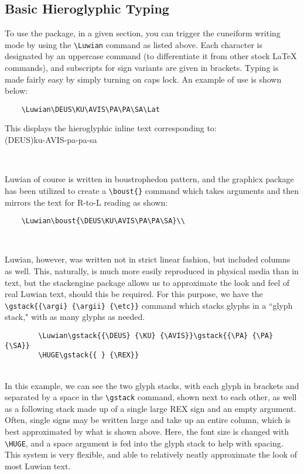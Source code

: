 \documentclass[12pt,A4]{article}
\begin{document}
\subsection{Basic Hieroglyphic Typing}
To use the package, in a given section, you can trigger the cuneiform writing mode by using the \verb|\Luwian| command as listed above. Each character is designated by an uppercase command (to differentiate it from other stock LaTeX commands), and subscripts for sign variants are given in brackets. Typing is made fairly easy by simply turning on caps lock. An example of use is shown below:
\begin{verbatim}
    \Luwian\DEUS\KU\AVIS\PA\PA\SA\Lat
\end{verbatim}
This displays the hieroglyphic inline text corresponding to: 
\\

\noindent(DEUS)ku-AVIS-pa-pa-sa

    \noindent\Luwian\DEUS\KU\AVIS\PA\PA\SA\\\Lat

Luwian of course is written in boustrophedon pattern, and the graphicx package has been utilized to create a \verb|\boust{}| command which takes arguments and then mirrors the text for R-to-L reading as shown:

\begin{verbatim}
    \Luwian\boust{\DEUS\KU\AVIS\PA\PA\SA}\\
\end{verbatim}
    \Luwian\boust{\DEUS\KU\AVIS\PA\PA\SA}\\\Lat

\newpage Luwian, however, was written not in strict linear fashion, but included columns as well. This, naturally, is much more easily reproduced in physical media than in text, but the stackengine package allows us to approximate the look and feel of real Luwian text, should this be required. For this purpose, we have the \verb|\gstack{{\argi} {\argii} {\etc}}| command which stacks glyphs in a ``glyph stack," with as many glyphs as needed.

    \begin{verbatim}
        \Luwian\gstack{{\DEUS} {\KU} {\AVIS}}\gstack{{\PA} {\PA} {\SA}}
        \HUGE\gstack{{ } {\REX}}
    \end{verbatim}
    \Luwian\gstack{{\DEUS} {\KU} {\AVIS}}\gstack{{\PA} {\PA} {\SA}}\HUGE\gstack{{ } {\REX}}\Lat\\

In this example, we can see the two glyph stacks, with each glyph in brackets and separated by a space in the \verb|\gstack| command, shown next to each other, as well as a following stack made up of a single large REX sign and an empty argument. Often, single signs may be written large and take up an entire column, which is best approximated by what is shown above. Here, the font size is changed with \verb|\HUGE|, and a space argument is fed into the glyph stack to help with spacing. This system is very flexible, and able to relatively neatly approximate the look of most Luwian text.\\
\end{document}
